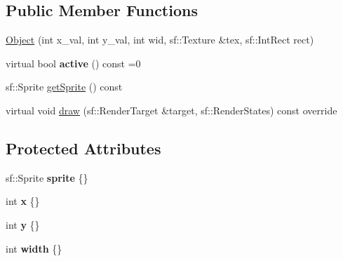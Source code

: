\subsection*{Public Member Functions}
\begin{DoxyCompactItemize}
\item 
\hyperlink{classObject_a5f8f752a3b0b7d68f15a5e2ff4d72f3b}{Object} (int x\+\_\+val, int y\+\_\+val, int wid, sf\+::\+Texture \&tex, sf\+::\+Int\+Rect rect)
\item 
\hypertarget{classObject_a097a320e7b93b92a27db87bb64bf5a63}{virtual bool {\bfseries active} () const =0}\label{classObject_a097a320e7b93b92a27db87bb64bf5a63}

\item 
sf\+::\+Sprite \hyperlink{classObject_a7541b5e9de4712cdb604035aaef66882}{get\+Sprite} () const 
\item 
virtual void \hyperlink{classObject_acfb343510263d8fb539979442e4e4e26}{draw} (sf\+::\+Render\+Target \&target, sf\+::\+Render\+States) const override
\end{DoxyCompactItemize}
\subsection*{Protected Attributes}
\begin{DoxyCompactItemize}
\item 
\hypertarget{classObject_a65be09abc56e93e0154c3a0e37f97579}{sf\+::\+Sprite {\bfseries sprite} \{\}}\label{classObject_a65be09abc56e93e0154c3a0e37f97579}

\item 
\hypertarget{classObject_aea8b4e1f4895ce5a0be5dbf42864669c}{int {\bfseries x} \{\}}\label{classObject_aea8b4e1f4895ce5a0be5dbf42864669c}

\item 
\hypertarget{classObject_a9ed372592e77352c832d721ad88b9aec}{int {\bfseries y} \{\}}\label{classObject_a9ed372592e77352c832d721ad88b9aec}

\item 
\hypertarget{classObject_a93596e8f620874b99326f8632365c8f5}{int {\bfseries width} \{\}}\label{classObject_a93596e8f620874b99326f8632365c8f5}

\end{DoxyCompactItemize}


